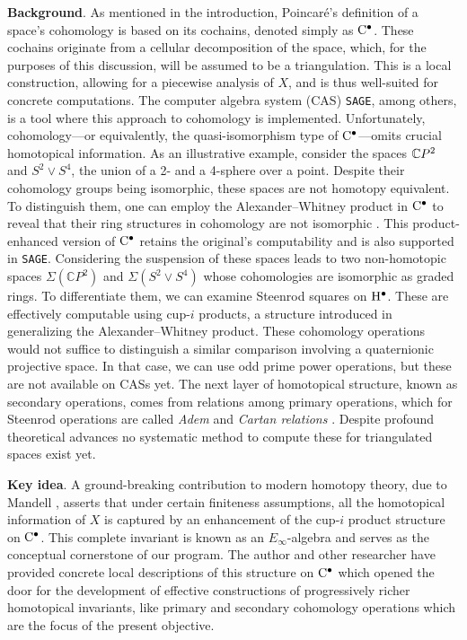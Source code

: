 \smallskip\textbf{Background}.
As mentioned in the introduction, Poincaré's definition of a space's cohomology is based on its cochains, denoted simply as $\mathrm{C}^\bullet$.
These cochains originate from a cellular decomposition of the space, which, for the purposes of this discussion, will be assumed to be a triangulation.
This is a local construction, allowing for a piecewise analysis of $X$, and is thus well-suited for concrete computations.
The computer algebra system (CAS) \texttt{SAGE}, among others, is a tool where this approach to cohomology is implemented.
Unfortunately, cohomology—or equivalently, the quasi-isomorphism type of $\mathrm{C}^\bullet$—omits crucial homotopical information.
As an illustrative example, consider the spaces $\mathbb{C} P^2$ and $S^2 \vee S^4$, the union of a 2- and a 4-sphere over a point.
Despite their cohomology groups being isomorphic, these spaces are not homotopy equivalent.
To distinguish them, one can employ the Alexander--Whitney product in $\mathrm{C}^\bullet$ to reveal that their ring structures in cohomology are not isomorphic \cite{alexander1936ring, whitney1938products}.
This product-enhanced version of $\mathrm{C}^\bullet$ retains the original's computability and is also supported in \texttt{SAGE}.
Considering the suspension of these spaces leads to two non-homotopic spaces $\Sigma(\mathbb{C} P^2)$ and $\Sigma(S^2 \vee S^4)$ whose cohomologies are isomorphic as graded rings.
To differentiate them, we can examine Steenrod squares on $\mathrm{H}^\bullet$.
These are effectively computable using cup-$i$ products, a structure introduced in \cite{steenrod1947products} generalizing the Alexander--Whitney product.
These cohomology operations would not suffice to distinguish a similar comparison involving a quaternionic projective space.
In that case, we can use odd prime power operations, but these are not available on CASs yet.
The next layer of homotopical structure, known as secondary operations, comes from relations among primary operations, which for Steenrod operations are called \textit{Adem} and \textit{Cartan relations} \cite{adem1952iteration,cartan1955steenrod}.
Despite profound theoretical advances \cite{baues2006secondary} no systematic method to compute these for triangulated spaces exist yet.

\smallskip\textbf{Key idea}.
A ground-breaking contribution to modern homotopy theory, due to Mandell \cite{mandell2001padic, mandell2006homotopy_type}, asserts that under certain finiteness assumptions, all the homotopical information of $X$ is captured by an enhancement of the cup-$i$ product structure on $\mathrm{C}^\bullet$.
This complete invariant is known as an $E_\infty$-algebra and serves as the conceptual cornerstone of our program.
The author and other researcher have provided concrete local descriptions of this structure on $\mathrm{C}^\bullet$ \cite{medina2020prop1, mcclure2003multivariable, berger2004combinatorial} which opened the door for the development of effective constructions of progressively richer homotopical invariants, like primary and secondary cohomology operations which are the focus of the present objective.

